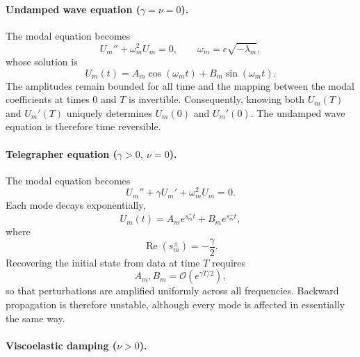 \documentclass{Configuration_Files/PoliMi3i_thesis}
\begin{document}
\paragraph{Undamped wave equation (\(\gamma=\nu=0\)).}

The modal equation becomes
\begin{equation*}
U_m''
+
\omega_m^2U_m
=
0,
\qquad
\omega_m
=
c\sqrt{-\lambda_m},
\end{equation*}
whose solution is
\begin{equation*}
U_m(t)
=
A_m\cos(\omega_mt)
+
B_m\sin(\omega_mt).
\end{equation*}
The amplitudes remain bounded for all time and the mapping between the modal coefficients at times \(0\) and \(T\) is invertible. Consequently, knowing both \(U_m(T)\) and \(U_m'(T)\) uniquely determines \(U_m(0)\) and \(U_m'(0)\). The undamped wave equation is therefore time reversible.

\paragraph{Telegrapher equation (\(\gamma>0,\ \nu=0\)).}

The modal equation becomes
\begin{equation*}
U_m''
+
\gamma U_m'
+
\omega_m^2U_m
=
0.
\end{equation*}
Each mode decays exponentially,
\begin{equation*}
U_m(t)
=
A_me^{s_m^+t}
+
B_me^{s_m^-t},
\end{equation*}
where
\begin{equation*}
\operatorname{Re}(s_m^\pm)
=
-\frac{\gamma}{2}.
\end{equation*}
Recovering the initial state from data at time \(T\) requires
\begin{equation*}
A_m,B_m
=
\mathcal{O}(e^{\gamma T/2}),
\end{equation*}
so that perturbations are amplified uniformly across all frequencies. Backward propagation is therefore unstable, although every mode is affected in essentially the same way.

\paragraph{Viscoelastic damping (\(\nu>0\)).}
\end{document}
